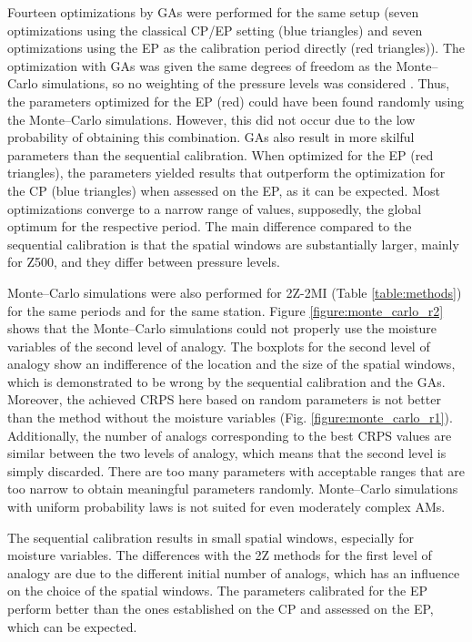 \documentclass[gmdd]{copernicus}
\begin{document}
Fourteen optimizations by GAs were performed for the same setup (seven optimizations using the classical CP/EP setting (blue triangles) and seven optimizations using the EP as the calibration period directly (red triangles)). The optimization with GAs was given the same degrees of freedom as the Monte--Carlo simulations, so no weighting of the pressure levels was considered \citep[as in][]{Horton2018a}. Thus, the parameters optimized for the EP (red) could have been found randomly using the Monte--Carlo simulations. However, this did not occur due to the low probability of obtaining this combination. GAs also result in more skilful parameters than the sequential calibration. When optimized for the EP (red triangles), the parameters yielded results that outperform the optimization for the CP (blue triangles) when assessed on the EP, as it can be expected. Most optimizations converge to a narrow range of values, supposedly, the global optimum for the respective period. The main difference compared to the sequential calibration is that the spatial windows are substantially larger, mainly for Z500, and they differ between pressure levels.  

Monte--Carlo simulations were also performed for 2Z-2MI (Table \ref{table:methods}) for the same periods and for the same station. Figure \ref{figure:monte_carlo_r2} shows that the Monte--Carlo simulations could not properly use the moisture variables of the second level of analogy. The boxplots for the second level of analogy show an indifference of the location and the size of the spatial windows, which is demonstrated to be wrong by the sequential calibration and the GAs. Moreover, the achieved CRPS here based on random parameters is not better than the method without the moisture variables (Fig. \ref{figure:monte_carlo_r1}). Additionally, the number of analogs corresponding to the best CRPS values are similar between the two levels of analogy, which means that the second level is simply discarded. There are too many parameters with acceptable ranges that are too narrow to obtain meaningful parameters randomly. Monte--Carlo simulations with uniform probability laws is not suited for even moderately complex AMs. 

The sequential calibration results in small spatial windows, especially for moisture variables. The differences with the 2Z methods for the first level of analogy are due to the different initial number of analogs, which has an influence on the choice of the spatial windows. The parameters calibrated for the EP perform better than the ones established on the CP and assessed on the EP, which can be expected.
\end{document}
